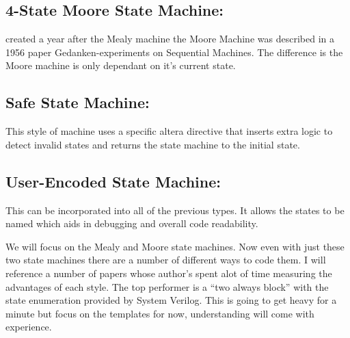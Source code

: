       \subsection{4-State Moore State Machine:} created a year after the Mealy machine the Moore Machine was described in a 1956 paper Gedanken-experiments on Sequential Machines. The difference is the Moore machine is only dependant on it's current state. \cite{Wikipedia:MooreMachine}
      
      \subsection{Safe State Machine:} This style of machine uses a specific altera directive that inserts extra logic to detect invalid states and returns the state machine to the initial state.
      
      \subsection{User-Encoded State Machine:} This can be incorporated into all of the previous types. It allows the states to be named which aids in debugging and overall code readability.

      We will focus on the Mealy and Moore state machines. Now even with just these two state machines there are a number of different ways to code them. I will reference a number of papers whose author's spent alot of time measuring the advantages of each style. The top performer is a ``two always block'' with the state enumeration provided by System Verilog. This is going to get heavy for a minute but focus on the templates for now, understanding will come with experience.

